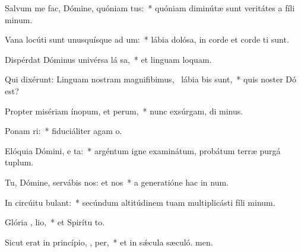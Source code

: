 \item Salvum me fac, Dómine, quóniam  tus:~* quóniam diminútæ sunt veritátes a fíli minum.
\item Vana locúti sunt unusquísque ad  um:~* lábia dolósa, in corde et corde ti sunt.
\item Dispérdat Dóminus univérsa lá sa,~* et linguam loquam.
\item Qui dixérunt: Linguam nostram magnifibimus,~\pscross{} lábia   bis sunt,~* quis noster Dó est?
\item Propter misériam ínopum, et  perum,~* nunc exsúrgam, di minus.
\item Ponam  ri:~* fiduciáliter agam  o.
\item Elóquia Dómini, e ta:~* argéntum igne examinátum, probátum terræ purgá tuplum.
\item Tu, Dómine, servábis nos: et  nos~* a generatióne hac in num.
\item In circúitu  bulant:~* secúndum altitúdinem tuam multiplicásti fíli minum.
\item Glória ,  lio,~* et Spirítu to.
\item Sicut erat in princípio,  ,  per,~* et in sǽcula sæculó. men.
